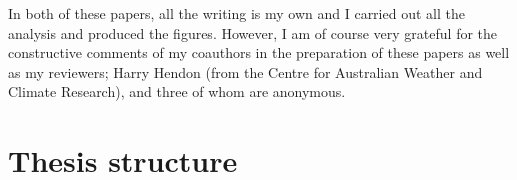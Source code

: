 In both of these papers, all the writing is my own and I carried out all the
analysis and produced the figures. However, I am of course very grateful for the
constructive comments of my coauthors in the preparation of these papers as well
as my reviewers; Harry Hendon (from the Centre for Australian Weather and
Climate Research), and three of whom are anonymous.

\section{Thesis structure}












